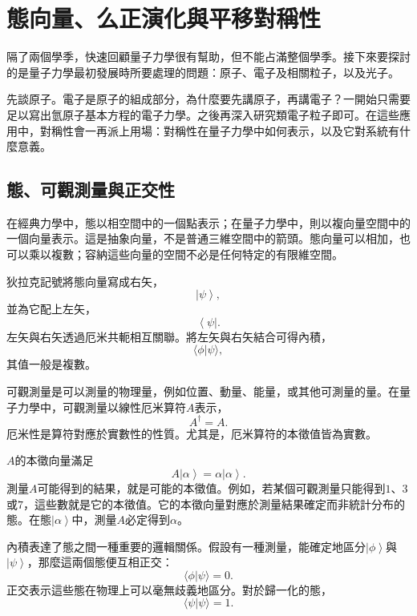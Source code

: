 \chapter{態向量、么正演化與平移對稱性}
\providecommand{\ket}[1]{\left\lvert#1\right\rangle}
\providecommand{\bra}[1]{\left\langle#1\right\rvert}

隔了兩個學季，快速回顧量子力學很有幫助，但不能占滿整個學季。接下來要探討的是量子力學最初發展時所要處理的問題：原子、電子及相關粒子，以及光子。

先談原子。電子是原子的組成部分，為什麼要先講原子，再講電子？一開始只需要足以寫出氫原子基本方程的電子力學。之後再深入研究類電子粒子即可。在這些應用中，對稱性會一再派上用場：對稱性在量子力學中如何表示，以及它對系統有什麼意義。

\section{態、可觀測量與正交性}

在經典力學中，態以相空間中的一個點表示；在量子力學中，則以複向量空間中的一個向量表示。這是抽象向量，不是普通三維空間中的箭頭。態向量可以相加，也可以乘以複數；容納這些向量的空間不必是任何特定的有限維空間。

狄拉克記號將態向量寫成右矢，
\begin{equation}
\ket{\psi},
\end{equation}
並為它配上左矢，
\begin{equation}
\bra{\psi}.
\end{equation}
左矢與右矢透過厄米共軛相互關聯。將左矢與右矢結合可得內積，
\begin{equation}
\langle\phi|\psi\rangle,
\end{equation}
其值一般是複數。

可觀測量是可以測量的物理量，例如位置、動量、能量，或其他可測量的量。在量子力學中，可觀測量以線性厄米算符\(A\)表示，
\begin{equation}
A^\dagger=A.
\end{equation}
厄米性是算符對應於實數性的性質。尤其是，厄米算符的本徵值皆為實數。

\(A\)的本徵向量滿足
\begin{equation}
A\ket{\alpha}=\alpha\ket{\alpha}.
\end{equation}
測量\(A\)可能得到的結果，就是可能的本徵值。例如，若某個可觀測量只能得到\(1\)、\(3\)或\(7\)，這些數就是它的本徵值。它的本徵向量對應於測量結果確定而非統計分布的態。在態\(\ket{\alpha}\)中，測量\(A\)必定得到\(\alpha\)。

內積表達了態之間一種重要的邏輯關係。假設有一種測量，能確定地區分\(\ket{\phi}\)與\(\ket{\psi}\)，那麼這兩個態便互相正交：
\begin{equation}
\langle\phi|\psi\rangle=0.
\end{equation}
正交表示這些態在物理上可以毫無歧義地區分。對於歸一化的態，
\begin{equation}
\langle\psi|\psi\rangle=1.
\end{equation}


